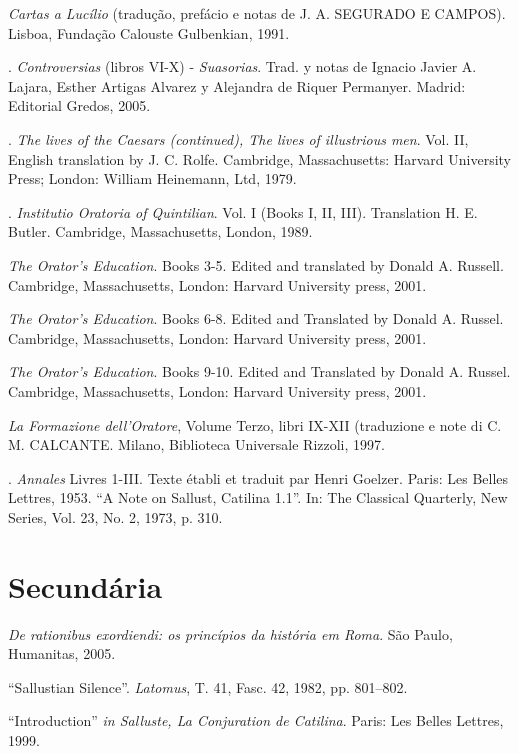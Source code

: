 \begin{bibliohedra}
 \emph{Cartas a Lucílio} (tradução, prefácio e notas de J. A. SEGURADO E CAMPOS). Lisboa, Fundação Calouste Gulbenkian, 1991.

. \emph{Controversias} (libros VI-X) - \emph{Suasorias}. Trad. y notas de Ignacio Javier A. Lajara, Esther Artigas Alvarez y Alejandra de Riquer Permanyer. Madrid: Editorial Gredos, 2005. 

. \emph{The lives of the Caesars (continued), The lives of illustrious men}. Vol. II, English translation by J. C. Rolfe. Cambridge, Massachusetts: Harvard University Press; London: William Heinemann, Ltd, 1979.

. \emph{Institutio Oratoria of Quintilian}. Vol. I (Books I, II, III). Translation H. E. Butler. Cambridge, Massachusetts, London, 1989.

\titidem \emph{The Orator’s Education}. Books 3-5. Edited and translated by Donald A. Russell. Cambridge, Massachusetts, London: Harvard University press, 2001.

\titidem \emph{The Orator’s Education}. Books 6-8. Edited and Translated by Donald A. Russel. Cambridge, Massachusetts, London: Harvard University press, 2001.


\titidem \emph{The Orator’s Education}. Books 9-10. Edited and Translated by Donald A. Russel. Cambridge, Massachusetts, London: Harvard University press, 2001.

 \emph{La Formazione dell’Oratore}, Volume Terzo, libri IX-XII (traduzione e note di C. M. CALCANTE. Milano, Biblioteca Universale Rizzoli, 1997.


.  \emph{Annales} Livres 1-III. Texte établi et traduit par Henri Goelzer. Paris: Les Belles Lettres, 1953. 
 “A Note on Sallust, Catilina 1.1”. In: The Classical Quarterly, New Series, Vol. 23, No. 2, 1973, p. 310.

\section{Secundária}



 \emph{De rationibus exordiendi: os princípios da história em Roma}. São Paulo, Humanitas, 2005.



 ``Sallustian Silence”. \emph{Latomus}, T. 41, Fasc. 42, 1982, pp. 801–802.

 ``Introduction'' \emph{in Salluste, La Conjuration de Catilina}. Paris: Les Belles Lettres, 1999.  


\end{bibliohedra}
